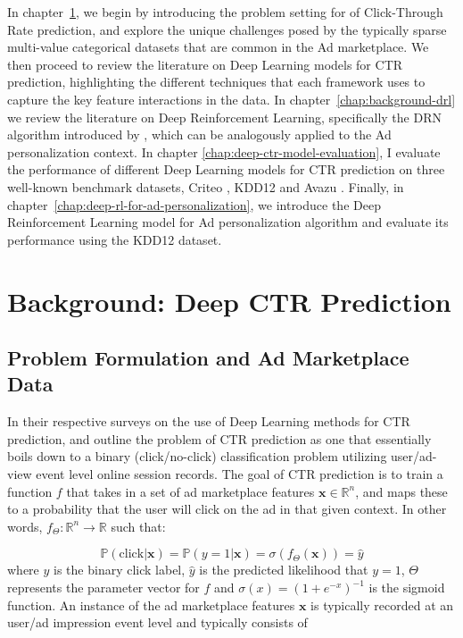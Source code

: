 \documentclass{mldsmsc}
\begin{document}
In chapter~\ref{chap:background-deepctr}, we begin by introducing the problem setting for
of Click-Through Rate prediction, and explore the unique challenges posed 
by the typically sparse multi-value categorical datasets that are common in the Ad marketplace. We then 
proceed to review the literature on Deep Learning models for CTR prediction, highlighting
the different techniques that each framework uses to capture the key feature interactions in the data. 
In chapter~\ref{chap:background-drl} we review the literature on Deep Reinforcement
Learning, specifically the DRN algorithm introduced by \cite{RefWorks:zheng2018drn:}, which can be analogously
applied to the Ad personalization context. In chapter \ref{chap:deep-ctr-model-evaluation}, I evaluate the performance of different
Deep Learning models for CTR prediction on three well-known benchmark datasets, Criteo \citep{RefWorks:tien2014display}, KDD12 \citep{RefWorks:aden2012kdd} 
and Avazu \citep{RefWorks:wang2014click-through}. Finally, in chapter~\ref{chap:deep-rl-for-ad-personalization}, we introduce the Deep Reinforcement Learning model for Ad personalization algorithm and evaluate its performance
using the KDD12 dataset.

\chapter{Background: Deep CTR Prediction}
\label{chap:background-deepctr}

\section{Problem Formulation and Ad Marketplace Data}
\label{sec:problem-formulation-data}

In their respective surveys on the use of Deep Learning methods for CTR prediction, \cite{RefWorks:gu2021ad} 
and \cite{RefWorks:zhang2021deep} outline the problem of CTR prediction as one that essentially boils down to
a binary (click/no-click) classification problem utilizing user/ad-view event level online session records. 
The goal of CTR prediction is to train a function $f$ that takes in a set of ad marketplace 
features $\mathbf{x} \in \mathbb{R}^n$, and maps these to a probability that the user 
will click on the ad in that given context. In other words, $f_{\Theta}: \mathbb{R}^n \rightarrow \mathbb{R}$ such that:

\begin{equation}
\label{eqn:ctr-classifier}
\mathbb{P}(\text{click}| \mathbf{x})
= \mathbb{P}(y = 1 | \mathbf{x})
= \sigma(f_{\Theta}(\mathbf{x}))
= \hat{y}
\end{equation}
where $y$ is the binary click label, $\hat{y}$ is the predicted likelihood that $y=1$, $\Theta$ represents the parameter vector for $f$ and
$\sigma(x)=(1 + e^{-x})^{-1}$ is the sigmoid function. 
An instance of the ad marketplace features $\mathbf{x}$ is typically
recorded at an user/ad impression event level and typically consists of
\end{document}
